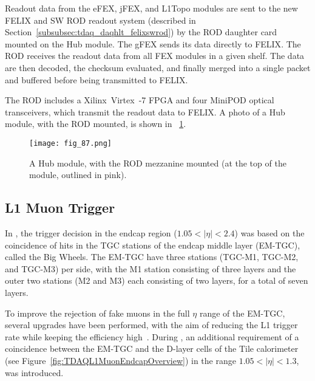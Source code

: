 \documentclass[cernpreprint, atlasdraft=false, UKenglish,british,orcidlogo, texmf, orcidlogo]{atlasdoc}
\begin{document}
Readout data from the \gls{eFEX}, \gls{jFEX}, and \gls{L1Topo} modules are sent to the new \gls{FELIX} and \gls{SW ROD} readout system (described in Section~\ref{subsubsec:tdaq_daqhlt_felixswrod}) by the \gls{ROD} daughter card mounted on the \gls{Hub} module.  The \gls{gFEX} sends its data directly to \gls{FELIX}.  The \gls{ROD} receives the readout data from all \gls{FEX} modules in a given shelf. The data are then decoded, the checksum evaluated, and finally merged into a single packet and buffered before being transmitted to \gls{FELIX}.
 
The \gls{ROD} includes a Xilinx\textregistered~Virtex\textregistered~-7 \gls{FPGA} and four MiniPOD optical transceivers, which transmit the readout data to \gls{FELIX}.  A photo of a \gls{Hub} module, with the \gls{ROD} mounted, is shown in ~\ref{fig:TDAQL1CaloHubROD}.
 
\begin{figure}[htbp]
\centerline{\texttt{[image: fig\_87.png]}}
\caption{A \gls{Hub} module, with the \gls{ROD} mezzanine mounted (at the top of the module, outlined in pink).}
\label{fig:TDAQL1CaloHubROD}
\end{figure}
 
\subsection{L1 Muon Trigger}\label{sec:TDAQ_L1Muon}
 
In \RunOne, the  trigger decision in the endcap region ($1.05 < |\eta| < 2.4$) was based on the coincidence of hits in the \gls{TGC} stations of the endcap middle layer (\gls{EM-TGC}), called the Big Wheels.  The \gls{EM-TGC} have three stations (TGC-M1, TGC-M2, and TGC-M3) per side, with the M1 station consisting of three layers and the outer two stations (M2 and M3) each consisting of two layers, for a total of seven layers.
 
To improve the rejection of fake muons in the full $\eta$ range of the \gls{EM-TGC}, several upgrades have been performed, with the aim of reducing the \gls{L1} trigger rate while keeping the efficiency high~\cite{TRIG-2018-01}.  During \RunTwo, an additional requirement of a coincidence between the \gls{EM-TGC} and the \gls{D-layer} cells of the Tile calorimeter (see Figure~\ref{fig:TDAQL1MuonEndcapOverview}) in the range $1.05 < |\eta| < 1.3$, was introduced.
 
\end{document}
